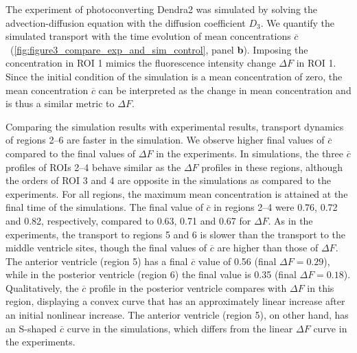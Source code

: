 \documentclass[fleqn]{wlscirep}
\begin{document}

The experiment of photoconverting Dendra2 was simulated by solving the advection-diffusion equation with the diffusion coefficient $D_3$. We quantify the simulated transport with the time evolution of mean concentrations $\overline{c}$~(\cref{fig:figure3_compare_exp_and_sim_control}, panel \textbf{b}). Imposing the concentration in ROI 1 mimics the fluorescence intensity change $\Delta F$ in ROI 1. Since the initial condition of the simulation is a mean concentration of zero, the mean concentration $\overline{c}$ can be interpreted as the change in mean concentration and is thus a similar metric to $\Delta F$.

Comparing the simulation results with experimental results, transport dynamics of regions 2--6 are faster in the simulation. We observe higher final values of $\overline{c}$ compared to the final values of $\Delta F$ in the experiments. In simulations, the three $\overline{c}$ profiles of ROIs 2--4 behave similar as the $\Delta F$ profiles in these regions, although the orders of ROI 3 and 4 are opposite in the simulations as compared to the experiments. For all regions, the maximum mean concentration is attained at the final time of the simulations. The final value of $\overline{c}$ in regions 2--4 were 0.76, 0.72 and 0.82, respectively, compared to 0.63, 0.71 and 0.67 for $\Delta F$. As in the experiments, the transport to regions 5 and 6 is slower than the transport to the middle ventricle sites, though the final values of $\overline{c}$ are higher than those of $\Delta F$. The anterior ventricle (region 5) has a final $\overline{c}$ value of 0.56 (final $\Delta F= 0.29$), while in the posterior ventricle (region 6) the final value is 0.35 (final $\Delta F= 0.18$). Qualitatively, the $\overline{c}$ profile in the posterior ventricle compares with $\Delta F$ in this region, displaying a convex curve that has an approximately linear increase after an initial nonlinear increase. The anterior ventricle (region 5), on other hand, has an S-shaped $\overline{c}$ curve in the simulations, which differs from the linear $\Delta F$ curve in the experiments. 
\end{document}
